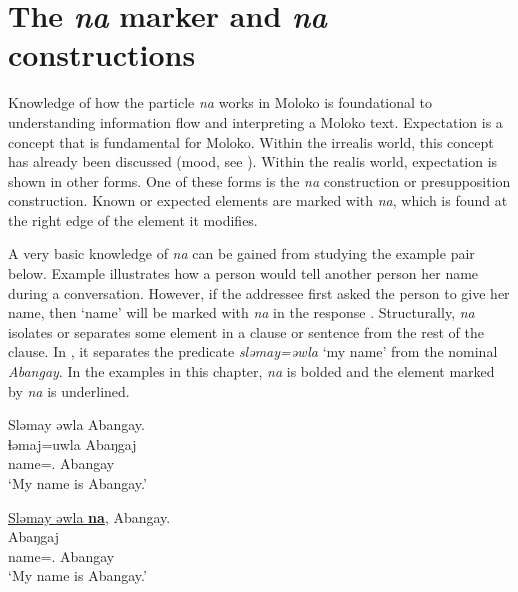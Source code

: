 \chapter[The na marker and na constructions]{The \textit{na} marker and \textit{na} constructions}\label{chap:11}
\hypertarget{RefHeading1213141525720847}{}
Knowledge of how the particle \textit{na} works in Moloko is foundational to understanding information flow and interpreting a Moloko text. Expectation is a concept that is fundamental for Moloko. Within the irrealis world, this concept has already been discussed (mood, see ). Within the realis world, expectation is shown in other forms. One of these forms is the \textit{na} construction or presupposition construction. Known or expected elements are marked with \textit{na}, which is found at the right edge of the element it modifies.

A very basic knowledge of \textit{na} can be gained from studying the example pair below. Example  illustrates how a person would tell another person her name during a conversation. However, if the addressee first asked the person to give her name, then ‘name’ will be marked with \textit{na} in the response . Structurally, \textit{na}  isolates or separates some element in a clause or sentence from the rest of the clause. In , it separates the predicate \textit{sl}\textit{əmay=əwla} ‘my name’ from the nominal \textit{Abangay}. In the examples in this chapter, \textit{na} is bolded and the element marked by \textit{na}  is underlined.

\ea \label{ex:11:1}
Sləmay  əwla  Abangay.\\
\gll  ɬəmaj=uwla     Abaŋgaj\\
      name={\oneS}.{\POSS}  Abangay\\
\glt  ‘My name is Abangay.’
\z

\ea \label{ex:11:2}
\underline{Sləmay  əwla  \textbf{na}},  Abangay.\\
\gll {}     Abaŋgaj\\
      name={\oneS}.{\POSS} {\PSP}  Abangay\\
\glt  ‘My name is Abangay.’
\z 

